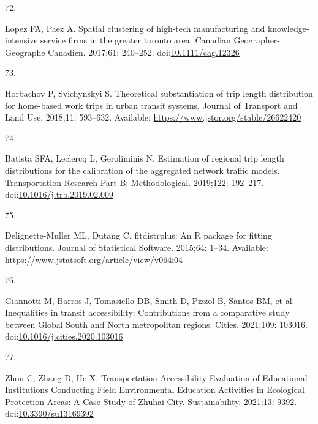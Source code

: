 \documentclass[10pt,letterpaper]{article}
\newlength{\cslhangindent}
\newlength{\csllabelwidth}
\newlength{\cslentryspacingunit} %
\newenvironment{CSLReferences}[2] %
 {%
  \setlength{\parindent}{0pt}
  \ifodd #1
  \let\oldpar\par
  \def\par{\hangindent=\cslhangindent\oldpar}
  \fi
  \setlength{\parskip}{#2\cslentryspacingunit}
 }%
 {}
\newcommand{\CSLLeftMargin}[1]{\parbox[t]{\csllabelwidth}{#1}}
\newcommand{\CSLRightInline}[1]{\parbox[t]{\linewidth - \csllabelwidth}{#1}\break}
\begin{document}
\begin{CSLReferences}{0}{0}
\leavevmode{}%
\CSLLeftMargin{72. }%
\CSLRightInline{Lopez FA, Paez A. Spatial clustering of high-tech
manufacturing and knowledge-intensive service firms in the greater
toronto area. Canadian Geographer-Geographe Canadien. 2017;61: 240--252.
doi:\href{https://doi.org/10.1111/cag.12326}{10.1111/cag.12326}}

\leavevmode{}%
\CSLLeftMargin{73. }%
\CSLRightInline{Horbachov P, Svichynskyi S. Theoretical substantiation
of trip length distribution for home-based work trips in urban transit
systems. Journal of Transport and Land Use. 2018;11: 593--632.
Available: \url{https://www.jstor.org/stable/26622420}}

\leavevmode{}%
\CSLLeftMargin{74. }%
\CSLRightInline{Batista SFA, Leclercq L, Geroliminis N. Estimation of
regional trip length distributions for the calibration of the aggregated
network traffic models. Transportation Research Part B: Methodological.
2019;122: 192--217.
doi:\href{https://doi.org/10.1016/j.trb.2019.02.009}{10.1016/j.trb.2019.02.009}}

\leavevmode{}%
\CSLLeftMargin{75. }%
\CSLRightInline{Delignette-Muller ML, Dutang C. {fitdistrplus}: An {R}
package for fitting distributions. Journal of Statistical Software.
2015;64: 1--34. Available:
\url{https://www.jstatsoft.org/article/view/v064i04}}

\leavevmode{}%
\CSLLeftMargin{76. }%
\CSLRightInline{Giannotti M, Barros J, Tomasiello DB, Smith D, Pizzol B,
Santos BM, et al. Inequalities in transit accessibility: {Contributions}
from a comparative study between {Global} {South} and {North}
metropolitan regions. Cities. 2021;109: 103016.
doi:\href{https://doi.org/10.1016/j.cities.2020.103016}{10.1016/j.cities.2020.103016}}

\leavevmode{}%
\CSLLeftMargin{77. }%
\CSLRightInline{Zhou C, Zhang D, He X. Transportation {Accessibility
Evaluation} of {Educational Institutions Conducting Field Environmental
Education Activities} in {Ecological Protection Areas}: {A Case Study}
of {Zhuhai City}. Sustainability. 2021;13: 9392.
doi:\href{https://doi.org/10.3390/su13169392}{10.3390/su13169392}}

\end{CSLReferences}

\nolinenumbers
\end{document}
